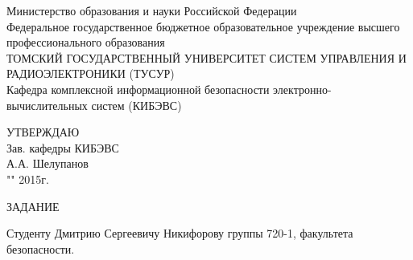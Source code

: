 \newpage
{}

\begin{center}
Министерство образования и науки Российской Федерации\\
Федеральное государственное бюджетное образовательное учреждение высшего профессионального образования\\
ТОМСКИЙ ГОСУДАРСТВЕННЫЙ УНИВЕРСИТЕТ СИСТЕМ УПРАВЛЕНИЯ И РАДИОЭЛЕКТРОНИКИ (ТУСУР)\\
Кафедра комплексной информационной безопасности электронно-вычислительных систем (КИБЭВС)\\
\end{center}

\begin{flushright}
 \begin{minipage}{0.4\textwidth}
  УТВЕРЖДАЮ \\
  Зав. кафедры КИБЭВС \\
  \underline{\hspace{2.5cm}}А.А. Шелупанов \\
  "\underline{\hspace{1cm}}"\underline{\hspace{3cm}} 2015г.
 \end{minipage}
\end{flushright}

\vspace{2cm}

\begin{center}
 ЗАДАНИЕ \\
\end{center}

Студенту Дмитрию Сергеевичу Никифорову группы 720-1, факультета безопасности.

% 
% 
% 
% 
% 
% 
% 
